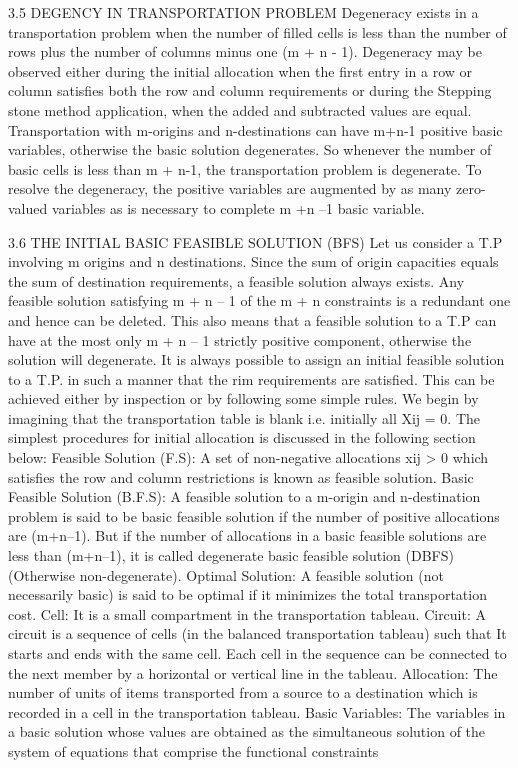 \documentclass{article}
\begin{document}
3.5 DEGENCY IN TRANSPORTATION PROBLEM 
Degeneracy exists in a transportation problem when the number of filled cells is less than the number of rows plus the number of columns minus one (m + n - 1). Degeneracy may be observed either during the initial allocation when the first entry in a row or column satisfies both the row and column requirements or during the Stepping stone method application, when the added and subtracted values are equal.
Transportation with m-origins and n-destinations can have m+n-1 positive basic variables, otherwise the basic solution degenerates. So whenever the number of basic cells is less than m + n-1, the transportation problem is degenerate. To resolve the degeneracy, the positive variables are augmented by as many zero-valued variables as is necessary to complete m +n –1 basic variable. 


3.6 THE INITIAL BASIC FEASIBLE SOLUTION (BFS) 
Let us consider a T.P involving m origins and n destinations. Since the sum of origin capacities equals the sum of destination requirements, a feasible solution always exists. Any feasible solution satisfying m + n – 1 of the m + n constraints is a redundant one and hence can be deleted. This also means that a feasible solution to a T.P can have at the most only m + n – 1 strictly positive component, otherwise the solution will degenerate. It is always possible to assign an initial feasible solution to a T.P. in such a manner that the rim requirements are satisfied. This can be achieved either by inspection or by following some simple rules. We begin by imagining that the transportation table is blank i.e. initially all Xij = 0. The simplest procedures for initial allocation is discussed in the following section below:
Feasible Solution (F.S):  A set of non-negative allocations xij > 0 which satisfies the row and column restrictions is known as feasible solution. 
Basic Feasible Solution (B.F.S): A feasible solution to a m-origin and n-destination problem is said to be basic feasible solution if the number of positive allocations are (m+n–1). But if the number of allocations in a basic feasible solutions are less than (m+n–1), it is called degenerate basic feasible solution (DBFS) (Otherwise non-degenerate). 
Optimal Solution: A feasible solution (not necessarily basic) is said to be optimal if it minimizes the total transportation cost. 
Cell: It is a small compartment in the transportation tableau. 
Circuit: A circuit is a sequence of cells (in the balanced transportation tableau) such that 
It starts and ends with the same cell. 
Each cell in the sequence can be connected to the next member by a horizontal or vertical line in the tableau. 
Allocation: The number of units of items transported from a source to a destination which is recorded in a cell in the transportation tableau. 
Basic Variables: The variables in a basic solution whose values are obtained as the simultaneous solution of the system of equations that comprise the functional constraints
\end{document}

